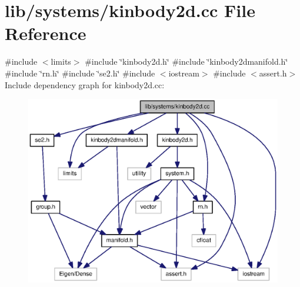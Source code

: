 \section{lib/systems/kinbody2d.cc \-File \-Reference}
\label{kinbody2d_8cc}
{\ttfamily \#include $<$limits$>$}\*
{\ttfamily \#include \char`\"{}kinbody2d.\-h\char`\"{}}\*
{\ttfamily \#include \char`\"{}kinbody2dmanifold.\-h\char`\"{}}\*
{\ttfamily \#include \char`\"{}rn.\-h\char`\"{}}\*
{\ttfamily \#include \char`\"{}se2.\-h\char`\"{}}\*
{\ttfamily \#include $<$iostream$>$}\*
{\ttfamily \#include $<$assert.\-h$>$}\*
\-Include dependency graph for kinbody2d.\-cc\-:
\nopagebreak
\begin{figure}[H]
\begin{center}
\leavevmode
\includegraphics[width=350pt]{kinbody2d_8cc__incl}
\end{center}
\end{figure}
